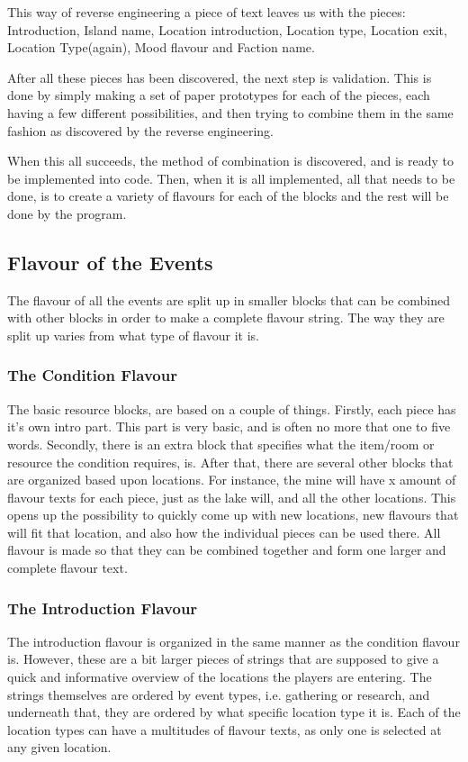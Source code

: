 This way of reverse engineering a piece of text leaves us with the pieces: Introduction, Island name, Location introduction, Location type, Location exit, Location Type(again), Mood flavour and Faction name.

After all these pieces has been discovered, the next step is validation. This is done by simply making a set of paper prototypes for each of the pieces, each having a few different possibilities, and then trying to combine them in the same fashion as discovered by the reverse engineering. 

When this all succeeds, the method of combination is discovered, and is ready to be implemented into code. Then, when it is all implemented, all that needs to be done, is to create a variety of flavours for each of the blocks and the rest will be done by the program.
\subsection{Flavour of the Events}
\label{sec:flav}

The flavour of all the events are split up in smaller blocks that can be combined with other blocks in order to make a complete flavour string. The way they are split up varies from what type of flavour it is.
\subsubsection{The Condition Flavour}
The basic resource blocks, are based on a couple of things. Firstly, each piece has it's own intro part. This part is very basic, and is often no more that one to five words. Secondly, there is an extra block that specifies what the item/room or resource the condition requires, is. After that, there are several other blocks that are organized based upon locations. For instance, the mine will have x amount of flavour texts for each piece, just as the lake will, and all the other locations. This opens up the possibility to quickly come up with new locations, new flavours that will fit that location, and also how the individual pieces can be used there. All flavour is made so that they can be combined together and form one larger and complete flavour text.
\subsubsection{The Introduction Flavour}
The introduction flavour is organized in the same manner as the condition flavour is. However, these are a bit larger pieces of strings that are supposed to give a quick and informative overview of the locations the players are entering. The strings themselves are ordered by event types, i.e. gathering or research, and underneath that, they are ordered by what specific location type it is. Each of the location types can have a multitudes of flavour texts, as only one is selected at any given location.
